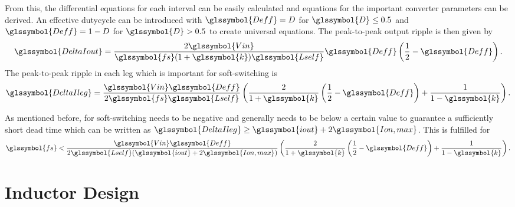 \documentclass{IPEC2026}
\newcommand{\sbl}[1]{\glssymbol{#1}}
\begin{document}
From this, the differential equations for each interval can be easily calculated and equations for the important converter parameters can be derived. An effective dutycycle \sbl{Deff} can be introduced with $\sbl{Deff} = D$ for $\sbl{D} \leq 0.5$ and $\sbl{Deff} = 1-D$ for $\sbl{D} > 0.5$ to create universal equations. The peak-to-peak output ripple is then given by
\begin{equation}
  \sbl{DeltaIout} = \frac{2\sbl{Vin}}{\sbl{fs}(1+\sbl{k})\sbl{Lself}}\sbl{Deff}\left (\frac{1}{2}-\sbl{Deff} \right ).
  \label{eq:DeltaIout}
\end{equation}
The peak-to-peak ripple in each leg which is important for soft-switching is
\begin{equation}
  \sbl{DeltaIleg} =  \frac{\sbl{Vin}\sbl{Deff}}{2\sbl{fs}\sbl{Lself}} \left (\frac{2}{1+\sbl{k}} \left (\frac{1}{2}-\sbl{Deff} \right ) + \frac{1}{1-\sbl{k}} \right ).
  \label{eq:DeltaIleg}
\end{equation}

As mentioned before, for soft-switching \sbl{Ion} needs to be negative and generally needs to be below a certain value to guarantee a sufficiently short dead time which can be written as $\sbl{DeltaIleg} \geq \sbl{iout}+2\sbl{Ion,max}$. This is fulfilled for
\begin{equation}
    \sbl{fs} < \frac{\sbl{Vin}\sbl{Deff}}{2\sbl{Lself}(\sbl{iout}+2\sbl{Ion,max})} \left (\frac{2}{1+\sbl{k}}\left (\frac{1}{2}-\sbl{Deff} \right ) + \frac{1}{1-\sbl{k}} \right ).
    \label{eq:ConditionZVS}
\end{equation}

\section{Inductor Design}
\end{document}
